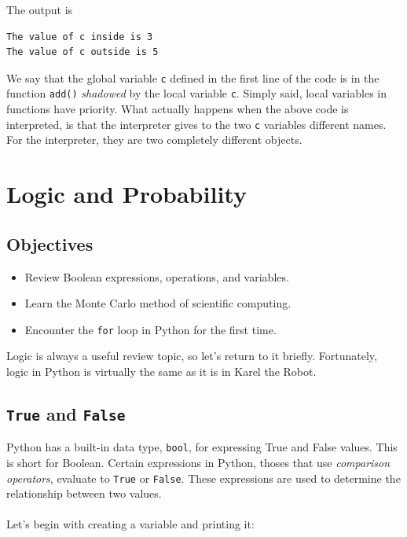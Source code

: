 \documentclass[article,A4,12pt]{llncs}
\begin{document}
\noindent
The output is\\

\begin{ybox}
\begin{verbatim}
The value of c inside is 3
The value of c outside is 5
\end{verbatim}
\end{ybox}
\vspace{6mm}

\noindent
We say that the global variable {\tt c} defined in the first line of the 
code is in the function {\tt add()} {\em shadowed} by the local variable {\tt c}. 
Simply said, local variables in functions have priority. What actually happens 
when the above code is interpreted, is that the interpreter gives to the two 
{\tt c} variables different names. For the interpreter,
they are two completely different objects. 



\section{Logic and Probability}

\subsection{Objectives}

\begin{itemize}
\item Review Boolean expressions, operations, and variables.
\item Learn the Monte Carlo method of scientific computing.
\item Encounter the {\tt for} loop in Python for the first time.
\end{itemize}
Logic is always a useful review topic, so let's return to it briefly. Fortunately, logic in Python is 
virtually the same as it is in Karel the Robot.

\subsection{{\tt True} and {\tt False}}

Python has a built-in data type, {\tt bool}, for expressing True and False values.  This is short for Boolean. Certain expressions in Python, thoses that use {\em comparison operators}, evaluate to {\tt True} or {\tt False}. These expressions are used to determine the relationship between two values.\\
\\
Let's begin with creating a variable and printing it:\\
\end{document}
